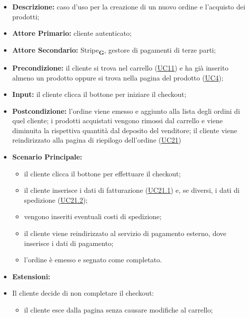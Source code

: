 \begin{itemize}
    \item \textbf{Descrizione:} caso d'uso per la creazione di un nuovo ordine e l'acquisto dei prodotti;
    \item \textbf{Attore Primario:} cliente autenticato;
    \item \textbf{Attore Secondario:} Stripe\textsubscript{\textbf{G}}, gestore di pagamenti di terze parti;
    \item \textbf{Precondizione:} il cliente si trova nel carrello (\hyperref[sec:UC11]{\underline{UC11}}) e ha già inserito almeno un prodotto oppure si trova nella pagina del prodotto (\hyperref[sec:UC4]{\underline{UC4}});
    \item \textbf{Input:} il cliente clicca il bottone per iniziare il checkout;
    \item \textbf{Postcondizione:} l'ordine viene emesso e aggiunto alla lista degli ordini di quel cliente; i prodotti acquistati vengono rimossi dal carrello e viene diminuita la rispettiva quantità dal deposito del venditore; il cliente viene reindirizzato alla pagina di riepilogo dell'ordine (\hyperref[sec:UC21]{\underline{UC21}})
    \item \textbf{Scenario Principale:}
          \begin{itemize}
              \item il cliente clicca il bottone per effettuare il checkout;
              \item il cliente inserisce i dati di fatturazione (\hyperref[sec:UC21.1]{\underline{UC21.1}}) e, se diversi, i dati di spedizione (\hyperref[sec:UC21.2]{\underline{UC21.2}});
              \item vengono inseriti eventuali costi di spedizione;
              \item il cliente viene reindirizzato al servizio di pagamento esterno, dove inserisce i dati di pagamento;
              \item l'ordine è emesso e segnato come completato.
          \end{itemize}
    \item \textbf{Estensioni:}
    \item Il cliente decide di non completare il checkout:
          \begin{itemize}
              \item  il cliente esce dalla pagina senza causare modifiche al carrello;
          \end{itemize}
\end{itemize}
